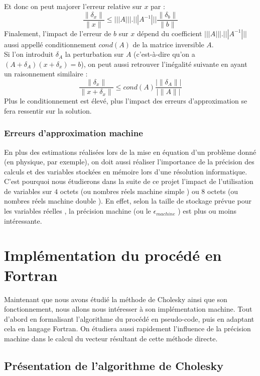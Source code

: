 \documentclass[a4paper, titlepage]{livret}													%
\begin{document}
			Et donc on peut majorer l'erreur relative sur $x$ par :
				\[
					\frac{\| \delta_{x} \|}{\| x \|} \leq ||| A ||| . ||| A^{-1} ||| \frac{\| \delta_{b} \|}{\| b \|}
				\]
			Finalement, l'impact de l'erreur de $b$ sur $x$ dépend du coefficient $||| A ||| . ||| A^{-1} |||$ aussi appellé conditionnement $cond(A)$ de la matrice inversible $A$.\\
			Si l'on introduit $\delta_{A}$ la perturbation sur $A$ (c'est-à-dire qu'on a $(A +\delta_{A})(x + \delta_{x}) = b$), on peut aussi retrouver l'inégalité suivante en ayant un raisonnement similaire :
				\[
					\frac{\| \delta_{x} \|}{\| x + \delta_{x} \|} \leq cond(A) \frac{|\| \delta_{A} \||}{|\| A \||}
				\]
			Plus le conditionnement est élevé, plus l'impact des erreurs d'approximation se fera ressentir sur la solution.

		\subsection{Erreurs d'approximation machine}
			En plus des estimations réalisées lors de la mise en équation d'un problème donné (en physique, par exemple), on doit aussi réaliser l'importance de la précision des calculs et des variables stockées en mémoire lors d'une résolution informatique.
			C'est pourquoi nous étudierons dans la suite de ce projet l'impact de l'utilisation de variables sur $4$ octets (ou nombres réels machine \og simple \fg{}) ou $8$ octets (ou nombres réels machine \og double \fg{}). 
			En effet, selon la taille de stockage prévue pour les variables \og réelles \fg{}, la précision machine (ou le \og $\epsilon_{machine}$ \fg{}) est plus ou moins intéressante.


\chapter{Implémentation du procédé en Fortran}
	Maintenant que nous avons étudié la méthode de Cholesky ainsi que son fonctionnement, nous allons nous intéresser à son implémentation machine. Tout d'abord en formalisant l'algorithme du procédé en pseudo-code, puis en adaptant cela en langage Fortran. On étudiera aussi rapidement l'influence de la précision machine dans le calcul du vecteur résultant de cette méthode directe.

	\section{Présentation de l'algorithme de Cholesky}
\end{document}
